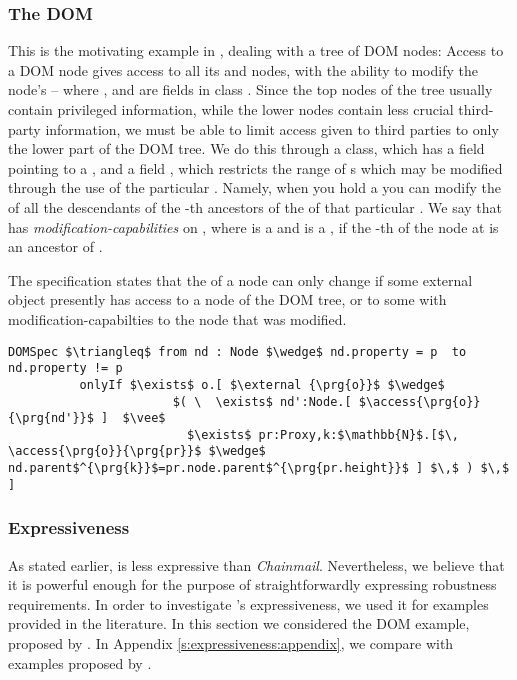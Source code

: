 \subsubsection{The DOM}  %
This is the motivating example in \cite{dd},
dealing with a tree of DOM nodes: Access to a DOM node
gives access to all its  and  nodes, with the ability to
modify the node's  -- where  ,  and 
are fields in class . Since the top nodes of the tree
usually contain privileged information, while the lower nodes contain
less crucial third-party information, we must be able to limit 
 access given to third parties to only the lower part of the DOM tree. We do this through a  class, which has a field  pointing to a , and a field , which restricts the range of s which may be modified through the use of the particular . Namely, when you hold a   you can modify the  of all the descendants of the    -th ancestors of the  of that particular .  We say that
 has \emph{modification-capabilities} on , where  is
a   and  is a , if the -th  
of the node at  is an ancestor of .


The specification  states that the  of a node can only change if
some external object presently has 
access to a node of the DOM tree, or to some  with modification-capabilties
to the node that was modified.
\begin{lstlisting}[language = Chainmail, mathescape=true, frame=lines]
DOMSpec $\triangleq$ from nd : Node $\wedge$ nd.property = p  to nd.property != p
          onlyIf $\exists$ o.[ $\external {\prg{o}}$ $\wedge$ 
                       $( \  \exists$ nd':Node.[ $\access{\prg{o}}{\prg{nd'}}$ ]  $\vee$ 
                         $\exists$ pr:Proxy,k:$\mathbb{N}$.[$\, \access{\prg{o}}{\prg{pr}}$ $\wedge$ nd.parent$^{\prg{k}}$=pr.node.parent$^{\prg{pr.height}}$ ] $\,$ ) $\,$ ]
\end{lstlisting}

\subsubsection{Expressiveness}
As stated earlier, \Nec is less expressive than
\emph{Chainmail}.
Nevertheless, we believe that
it  is powerful enough for the purpose of straightforwardly
expressing robustness requirements. 
In order to investigate \Nec's expressiveness,  
we used it for
examples provided in the literature. In this section we considered the DOM example, 
proposed by  \citeauthor{dd}. In Appendix \ref{s:expressiveness:appendix},
we compare with examples proposed by  \citeauthor{FASE}.
 

